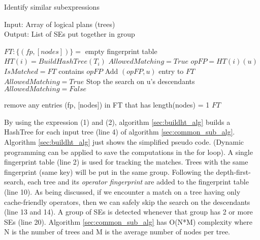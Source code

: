 \begin{algorithm}
\caption{Identify similar subexpressions}\label{sec:common_sub_alg}
Input: Array of logical plans (trees)\\
Output: List of SEs put together in group
\begin{algorithmic}[1]
\State $FT:\{(fp, [nodes])\} =$ empty fingerprint table
	\State$HT(i) = BuildHashTree(T_{i})$
	\State $AllowedMatching = True$	
		\State $opFP = HT(i)(u)$
		\State $IsMatched = FT$ contains $opFP$
				\State Add $(opFP, u)$ entry to $FT$
		\EndIf
		\State $AllowedMatching = True$	
			\State Stop the search on u's descendants
			\State $AllowedMatching = False$	
		\EndIf		
	\EndFor
	
\EndFor
\State remove any entries (fp, [nodes]) in FT that has length(nodes) = 1
\State \Return  $FT$
\EndProcedure
\end{algorithmic}
\end{algorithm}

By using the expression (1) and (2), algorithm \ref{sec:buildht_alg} builds a HashTree for each input tree (line 4) of algorithm \ref{sec:common_sub_alg}. Algorithm \ref{sec:buildht_alg} just shows the simplified pseudo code. (Dynamic programming can be applied to save the computations in the for loop). A single fingerprint table (line 2) is used for tracking the matches. Trees with the same fingerprint (same key) will be put in the same group. Following the depth-first-search, each tree and its \emph{operator fingerprint} are added to the fingerprint table (line 10). As being discussed, if we encounter a match on a tree having only cache-friendly operators, then we can safely skip the search on the descendants (line 13 and 14). A group of SEs is detected whenever that group has 2 or more SEs (line 20). Algorithm \ref{sec:common_sub_alg} has O(N*M) complexity where N is the number of trees and M is the average number of nodes per tree.